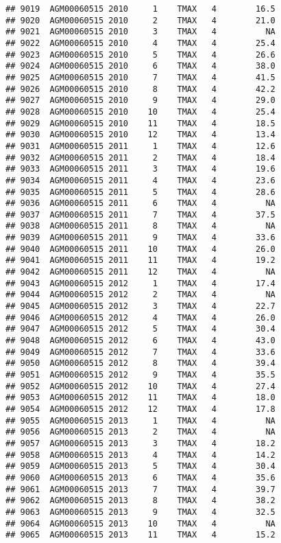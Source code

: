 \documentclass{article}\usepackage[]{graphicx}\usepackage[]{color}
\makeatletter
\newenvironment{kframe}{%
 \def\at@end@of@kframe{}%
 \ifinner\ifhmode%
  \def\at@end@of@kframe{\end{minipage}}%
  \begin{minipage}{\columnwidth}%
 \fi\fi%
 \def\FrameCommand##1{\hskip\@totalleftmargin \hskip-\fboxsep
 \colorbox{shadecolor}{##1}\hskip-\fboxsep
     \hskip-\linewidth \hskip-\@totalleftmargin \hskip\columnwidth}%
 \MakeFramed {\advance\hsize-\width
   \@totalleftmargin\z@ \linewidth\hsize
   \@setminipage}}%
 {\par\unskip\endMakeFramed%
 \at@end@of@kframe}
\newenvironment{knitrout}{}{} %
\makeatother
\begin{document}
\begin{knitrout}
\begin{kframe}
\begin{verbatim}
## 9019  AGM00060515 2010     1    TMAX   4        16.5
## 9020  AGM00060515 2010     2    TMAX   4        21.0
## 9021  AGM00060515 2010     3    TMAX   4          NA
## 9022  AGM00060515 2010     4    TMAX   4        25.4
## 9023  AGM00060515 2010     5    TMAX   4        26.6
## 9024  AGM00060515 2010     6    TMAX   4        38.0
## 9025  AGM00060515 2010     7    TMAX   4        41.5
## 9026  AGM00060515 2010     8    TMAX   4        42.2
## 9027  AGM00060515 2010     9    TMAX   4        29.0
## 9028  AGM00060515 2010    10    TMAX   4        25.4
## 9029  AGM00060515 2010    11    TMAX   4        18.5
## 9030  AGM00060515 2010    12    TMAX   4        13.4
## 9031  AGM00060515 2011     1    TMAX   4        12.6
## 9032  AGM00060515 2011     2    TMAX   4        18.4
## 9033  AGM00060515 2011     3    TMAX   4        19.6
## 9034  AGM00060515 2011     4    TMAX   4        23.6
## 9035  AGM00060515 2011     5    TMAX   4        28.6
## 9036  AGM00060515 2011     6    TMAX   4          NA
## 9037  AGM00060515 2011     7    TMAX   4        37.5
## 9038  AGM00060515 2011     8    TMAX   4          NA
## 9039  AGM00060515 2011     9    TMAX   4        33.6
## 9040  AGM00060515 2011    10    TMAX   4        26.0
## 9041  AGM00060515 2011    11    TMAX   4        19.2
## 9042  AGM00060515 2011    12    TMAX   4          NA
## 9043  AGM00060515 2012     1    TMAX   4        17.4
## 9044  AGM00060515 2012     2    TMAX   4          NA
## 9045  AGM00060515 2012     3    TMAX   4        22.7
## 9046  AGM00060515 2012     4    TMAX   4        26.0
## 9047  AGM00060515 2012     5    TMAX   4        30.4
## 9048  AGM00060515 2012     6    TMAX   4        43.0
## 9049  AGM00060515 2012     7    TMAX   4        33.6
## 9050  AGM00060515 2012     8    TMAX   4        39.4
## 9051  AGM00060515 2012     9    TMAX   4        35.5
## 9052  AGM00060515 2012    10    TMAX   4        27.4
## 9053  AGM00060515 2012    11    TMAX   4        18.0
## 9054  AGM00060515 2012    12    TMAX   4        17.8
## 9055  AGM00060515 2013     1    TMAX   4          NA
## 9056  AGM00060515 2013     2    TMAX   4          NA
## 9057  AGM00060515 2013     3    TMAX   4        18.2
## 9058  AGM00060515 2013     4    TMAX   4        14.2
## 9059  AGM00060515 2013     5    TMAX   4        30.4
## 9060  AGM00060515 2013     6    TMAX   4        35.6
## 9061  AGM00060515 2013     7    TMAX   4        39.7
## 9062  AGM00060515 2013     8    TMAX   4        38.2
## 9063  AGM00060515 2013     9    TMAX   4        32.5
## 9064  AGM00060515 2013    10    TMAX   4          NA
## 9065  AGM00060515 2013    11    TMAX   4        15.2

\end{verbatim}
\end{kframe}
\end{knitrout}
\end{document}
